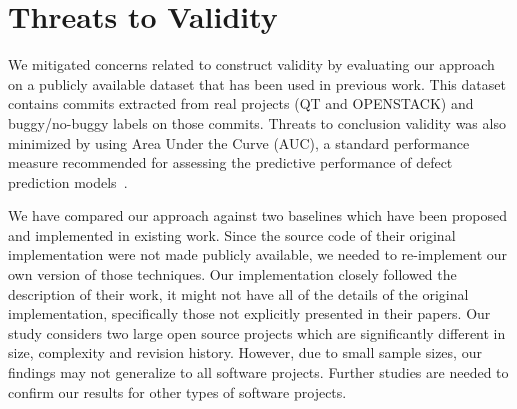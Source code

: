 \section{Threats to Validity}
\label{sec:threat}
We mitigated concerns related to construct validity by evaluating our approach on a publicly available dataset that has been used in previous work. This dataset contains commits extracted from real projects (QT and OPENSTACK) and buggy/no-buggy labels on those commits. Threats to conclusion validity was also minimized by using Area Under the Curve (AUC), a standard performance measure recommended for assessing the predictive performance of defect prediction models~\cite{tantithamthavorn2018optimization}. 

We have compared our approach against two baselines which have been proposed and implemented in existing work. Since the source code of their original implementation were not made publicly available, we needed to re-implement our own version of those techniques. Our implementation closely followed the description of their work, it might not have all of the details of the original implementation, specifically those not explicitly presented in their papers. Our study considers two large open source projects which are significantly different in size, complexity and revision history. However, due to small sample sizes, our findings may not generalize to all software projects. Further studies are needed to confirm our results for other types of software projects.
